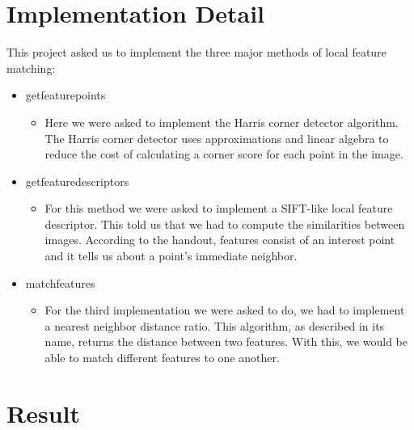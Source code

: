 \section*{Implementation Detail}
This project asked us to implement the three major methods of local feature matching:
\begin{itemize}
    \item getfeaturepoints
    \begin{itemize}
        \item Here we were asked to implement the Harris corner detector algorithm. The Harris corner detector uses approximations and linear algebra to reduce the cost of calculating a corner score for each point in the image.
    \end{itemize}
    
    \item getfeaturedescriptors
    \begin{itemize}
        \item For this method we were asked to implement a SIFT-like local feature descriptor. This told us that we had to compute the similarities between images. According to the handout, features consist of an interest point and it tells us about a point's immediate neighbor.  
    \end{itemize}
    
    \item matchfeatures
    \begin{itemize}
        \item For the third implementation we were asked to do, we had to implement a nearest neighbor distance ratio. This algorithm, as described in its name, returns the distance between two features. With this, we would be able to match different features to one another.
    \end{itemize}
\end{itemize}





\section*{Result}


